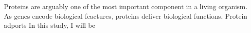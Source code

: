 Proteins are arguably one of the most important component in a living organism. As genes encode biological feactures, proteins deliver biological functions. Protein adports  In this study, I will be 